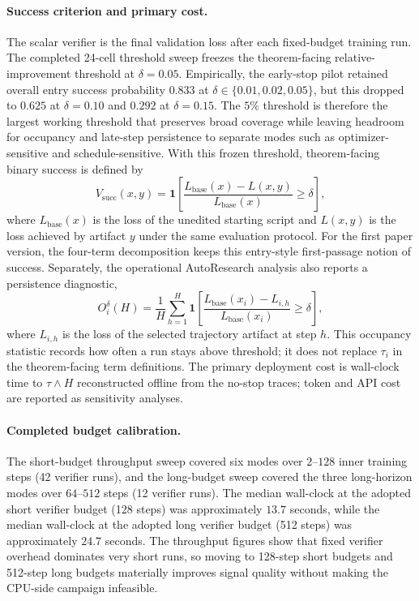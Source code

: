 \documentclass{article}
\begin{document}
\paragraph{Success criterion and primary cost.}
The scalar verifier is the final validation loss after each fixed-budget training run.
The completed 24-cell threshold sweep freezes the theorem-facing relative-improvement threshold at $\delta=0.05$.
Empirically, the early-stop pilot retained overall entry success probability $0.833$ at $\delta\in\{0.01,0.02,0.05\}$, but this dropped to $0.625$ at $\delta=0.10$ and $0.292$ at $\delta=0.15$.
The $5\%$ threshold is therefore the largest working threshold that preserves broad coverage while leaving headroom for occupancy and late-step persistence to separate modes such as optimizer-sensitive and schedule-sensitive.
With this frozen threshold, theorem-facing binary success is defined by
\[
  V_{\mathrm{succ}}(x,y)=\mathbf{1}\!\left[\frac{L_{\mathrm{base}}(x)-L(x,y)}{L_{\mathrm{base}}(x)}\ge \delta\right],
\]
where $L_{\mathrm{base}}(x)$ is the loss of the unedited starting script and $L(x,y)$ is the loss achieved by artifact $y$ under the same evaluation protocol.
For the first paper version, the four-term decomposition keeps this entry-style first-passage notion of success.
Separately, the operational AutoResearch analysis also reports a persistence diagnostic,
\[
  O_i^{\delta}(H)=\frac{1}{H}\sum_{h=1}^{H}\mathbf{1}\!\left[\frac{L_{\mathrm{base}}(x_i)-L_{i,h}}{L_{\mathrm{base}}(x_i)}\ge \delta\right],
\]
where $L_{i,h}$ is the loss of the selected trajectory artifact at step $h$.
This occupancy statistic records how often a run stays above threshold; it does not replace $\tau_i$ in the theorem-facing term definitions.
The primary deployment cost is wall-clock time to $\tau\wedge H$ reconstructed offline from the no-stop traces; token and API cost are reported as sensitivity analyses.

\paragraph{Completed budget calibration.}
The short-budget throughput sweep covered six modes over $2$--$128$ inner training steps (42 verifier runs), and the long-budget sweep covered the three long-horizon modes over $64$--$512$ steps (12 verifier runs).
The median wall-clock at the adopted short verifier budget (128 steps) was approximately $13.7$ seconds, while the median wall-clock at the adopted long verifier budget (512 steps) was approximately $24.7$ seconds.
The throughput figures show that fixed verifier overhead dominates very short runs, so moving to 128-step short budgets and 512-step long budgets materially improves signal quality without making the CPU-side campaign infeasible.
\end{document}
